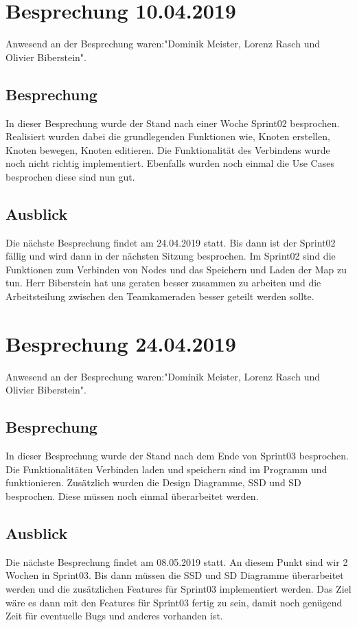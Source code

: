 \documentclass[a4paper,parskip]{scrartcl}
\begin{document}
\section{Besprechung 10.04.2019}
Anwesend an der Besprechung waren:"Dominik Meister, Lorenz Rasch und Olivier Biberstein". 
\subsection{Besprechung}
In dieser Besprechung wurde der Stand nach einer Woche Sprint02 besprochen. Realisiert wurden dabei die 
grundlegenden Funktionen wie, Knoten erstellen, Knoten bewegen, Knoten editieren. Die Funktionalität des Verbindens wurde noch nicht richtig implementiert. Ebenfalls wurden noch einmal die Use Cases besprochen diese sind nun gut. 
\subsection{Ausblick}
Die nächste Besprechung findet am 24.04.2019 statt. Bis dann ist der Sprint02 fällig und wird dann in der nächsten Sitzung besprochen. Im Sprint02 sind die Funktionen zum Verbinden von Nodes und das Speichern und
Laden der Map zu tun. Herr Biberstein hat uns geraten besser zusammen zu arbeiten und die Arbeitsteilung
zwischen den Teamkameraden besser geteilt werden sollte.

\section{Besprechung 24.04.2019}
Anwesend an der Besprechung waren:"Dominik Meister, Lorenz Rasch und Olivier Biberstein". 
\subsection{Besprechung}
In dieser Besprechung wurde der Stand nach dem Ende von Sprint03 besprochen. Die Funktionalitäten Verbinden laden und speichern sind im Programm und funktionieren. Zusätzlich wurden die Design Diagramme, SSD und SD besprochen. Diese müssen noch einmal überarbeitet werden.
\subsection{Ausblick}
Die nächste Besprechung findet am 08.05.2019 statt. An diesem Punkt sind wir 2 Wochen in Sprint03. Bis dann müssen die SSD und SD Diagramme überarbeitet werden und die zusätzlichen Features für Sprint03 implementiert werden. Das Ziel wäre es dann mit den Features für Sprint03 fertig zu sein, damit noch
genügend Zeit für eventuelle Bugs und anderes vorhanden ist.
\end{document}
